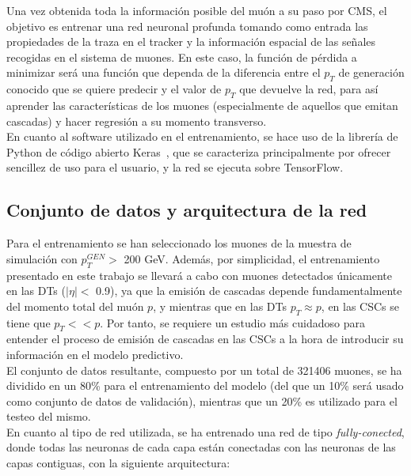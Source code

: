 
Una vez obtenida toda la informaci\'on posible del mu\'on a su paso por CMS, el objetivo es entrenar una red neuronal profunda tomando como entrada las propiedades de la traza en el tracker y la informaci\'on espacial de las se\~nales recogidas en el sistema de muones. En este caso, la funci\'on de p\'erdida a minimizar ser\'a una funci\'on que dependa de la diferencia entre el $p_{T}$ de generaci\'on conocido que se quiere predecir y el valor de $p_{T}$ que devuelve la red, para as\'i aprender las caracter\'isticas de los muones (especialmente de aquellos que emitan cascadas) y hacer regresi\'on a su momento transverso. \\

En cuanto al software utilizado en el entrenamiento, se hace uso de la librer\'ia de Python de c\'odigo abierto Keras~\cite{chollet2015keras}, que se caracteriza principalmente por ofrecer sencillez de uso para el usuario, y la red se ejecuta sobre TensorFlow. \\


\subsection{Conjunto de datos y arquitectura de la red}\label{sec:arch}

Para el entrenamiento se han seleccionado los muones de la muestra de simulaci\'on con $p_{T}^{GEN} >$ 200 GeV. Adem\'as, por simplicidad, el entrenamiento presentado en este trabajo se llevar\'a a cabo con muones detectados \'unicamente en las DTs ($\lvert \eta \rvert <$ 0.9), ya que la emisi\'on de cascadas depende fundamentalmente del momento total del mu\'on $p$, y mientras que en las DTs $p_{T} \approx p$, en las CSCs se tiene que $p_{T} << p$. Por tanto, se requiere un estudio m\'as cuidadoso para entender el proceso de emisi\'on de cascadas en las CSCs a la hora de introducir su informaci\'on en el modelo predictivo. \\

El conjunto de datos resultante, compuesto por un total de 321406 muones, se ha dividido en un 80\% para el entrenamiento del modelo (del que un 10\% ser\'a usado como conjunto de datos de validaci\'on), mientras que un 20\% es utilizado para el testeo del mismo. \\

En cuanto al tipo de red utilizada, se ha entrenado una red de tipo \textit{fully-conected}, donde todas las neuronas de cada capa est\'an conectadas con las neuronas de las capas contiguas, con la siguiente arquitectura:

